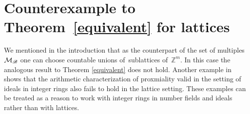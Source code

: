 \documentclass[leqno,a4paper,12pt]{article}
\theoremstyle{definition}
\newcommand{\cM}{{\cal M}}
\newcommand{\Z}{{\mathbb{Z}}}
\newcommand{\sB}{\mathscr{B}}
\begin{document}
%



\section{Counterexample to Theorem~\ref{equivalent} for lattices}\label{se5}
We mentioned in the introduction that as the counterpart of the set of multiples $\cM_{\sB}$ one can choose countable unions of~sublattices of~$\Z^m$. In this case the analogous result to Theorem \ref{equivalent} does not hold. Another example in \cite{MR4251829} shows that the arithmetic characterization of proxmiality valid in the setting of ideals in integer rings also fails to hold in the lattice setting. These examples can be treated as a reason to work with integer rings in number fields and ideals rather than with lattices.
\end{document}
